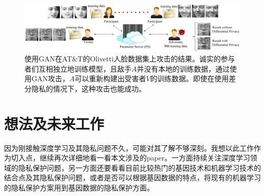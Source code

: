 \documentclass[a4paper]{article}
\begin{document}
\begin{figure}[!ht]
\includegraphics[width = \linewidth]{fig/41_participants.pdf}
\caption{使用GAN在AT\&T的Olivetti人脸数据集上攻击的结果。诚实的参与者们互相独立地训练模型，且敌手$A$并没有本地的训练数据，通过使用GAN攻击，$A$可以重新构建出受害者$V$的训练数据。即使在使用差分隐私的情况下，这种攻击也能成功。}
\label{fig:41_participants}
\end{figure}


\section{想法及未来工作}
因为刚接触深度学习及其隐私问题不久，可能对其了解不够深刻。我想以此工作作为切入点，继续再次详细地看一看本文涉及的paper。一方面持续关注深度学习领域的隐私保护问题，另一方面还要看看目前比较热门的基因技术和机器学习技术的结合点及其隐私保护问题，或者是否可以根据基因数据的特点，将现有的机器学习的隐私保护方案用到基因数据的隐私保护方面。



\end{document}

